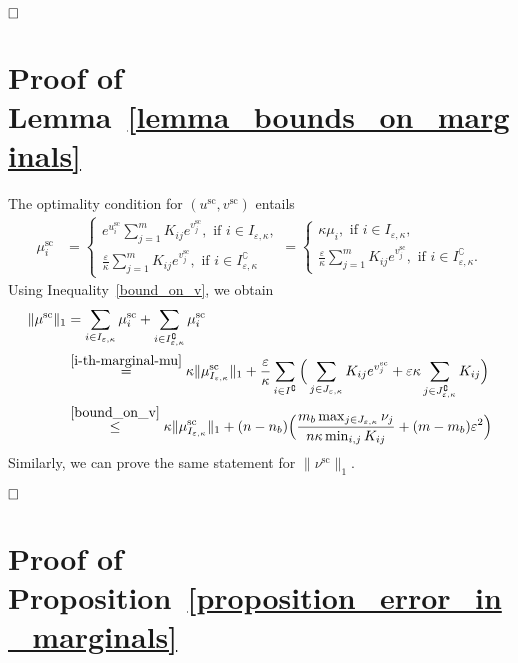 \documentclass{article}
\newcommand{\norm}[1]{\|#1\|}
\begin{document}
$\hfill\square$

\section{Proof of Lemma~\ref{lemma_bounds_on_marginals}}


The optimality condition for $({u}^{\text{sc}}, {v}^{\text{sc}})$ entails 
\begin{align}
\label{i-th-marginal-mu} %
{\mu}^{\text{sc}}_i  &= 
\begin{cases}
e^{u^{\text{sc}}_i} \sum_{j=1}^m K_{ij} e^{v^{\text{sc}}_j}, \text{ if  }i \in I_{\varepsilon,\kappa},\\
\frac \varepsilon\kappa\sum_{j=1}^m K_{ij} e^{v^{\text{sc}}_j}, \text{ if  }i \in I^\complement_{\varepsilon,\kappa}
\end{cases}
=\begin{cases}
\kappa \mu_i, \text{ if  }i \in I_{\varepsilon,\kappa},\\
\frac \varepsilon\kappa\sum_{j=1}^m K_{ij} e^{v^{\text{sc}}_j}, \text{ if  }i \in I^\complement_{\varepsilon,\kappa}.
\end{cases}
\end{align}
Using Inequality~\eqref{bound_on_v}, we obtain 
\begin{align*}
\norm{\mu^{\text{sc}}}_1 &= \sum_{i \in I_{\varepsilon,\kappa}} \mu^{\text{sc}}_i +  \sum_{i \in I^\complement_{\varepsilon,\kappa}}\mu^{\text{sc}}_i\\
& \overset{\eqref{i-th-marginal-mu}}{=} \kappa \norm{\mu_{I_{\varepsilon,\kappa}}^{\text{sc}}}_1 + \frac \varepsilon\kappa \sum_{i \in I^\complement}\Big( \sum_{j \in J_{\varepsilon,\kappa}} K_{ij} e^{v^{\text{sc}}_j} + \varepsilon\kappa \sum_{j\in J^\complement_{\varepsilon,\kappa}}K_{ij}\Big)\\
& \overset{\eqref{bound_on_v}}{\leq} \kappa \norm{\mu_{I_{\varepsilon,\kappa}}^{\text{sc}}}_1 + (n-n_b) \Big(\frac{m_b\max_{j \in J_{\varepsilon,\kappa}} \nu_j}{n\kappa\min_{i,j}K_{ij}} + (m-m_b)\varepsilon^2 \Big)
\end{align*}
Similarly, we can prove the same statement for $\norm{\nu^{\text{sc}}}_1$.

$\hfill\square$

\section{Proof of Proposition~\ref{proposition_error_in_marginals}}
\end{document}
